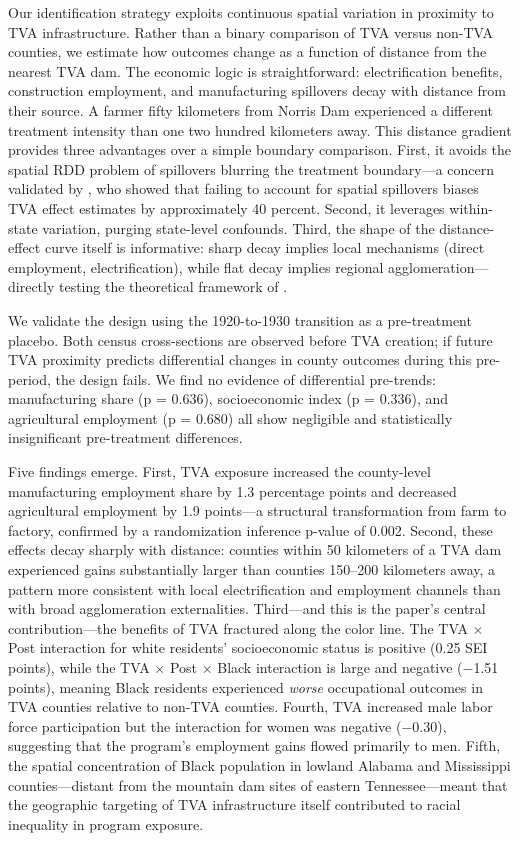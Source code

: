 \documentclass[12pt]{article}
\begin{document}
Our identification strategy exploits continuous spatial variation in proximity to TVA infrastructure. Rather than a binary comparison of TVA versus non-TVA counties, we estimate how outcomes change as a function of distance from the nearest TVA dam. The economic logic is straightforward: electrification benefits, construction employment, and manufacturing spillovers decay with distance from their source. A farmer fifty kilometers from Norris Dam experienced a different treatment intensity than one two hundred kilometers away. This distance gradient provides three advantages over a simple boundary comparison. First, it avoids the spatial RDD problem of spillovers blurring the treatment boundary---a concern validated by \citet{butts2024}, who showed that failing to account for spatial spillovers biases TVA effect estimates by approximately 40 percent. Second, it leverages within-state variation, purging state-level confounds. Third, the shape of the distance-effect curve itself is informative: sharp decay implies local mechanisms (direct employment, electrification), while flat decay implies regional agglomeration---directly testing the theoretical framework of \citet{kline2014}.

We validate the design using the 1920-to-1930 transition as a pre-treatment placebo. Both census cross-sections are observed before TVA creation; if future TVA proximity predicts differential changes in county outcomes during this pre-period, the design fails. We find no evidence of differential pre-trends: manufacturing share (p = 0.636), socioeconomic index (p = 0.336), and agricultural employment (p = 0.680) all show negligible and statistically insignificant pre-treatment differences.

Five findings emerge. First, TVA exposure increased the county-level manufacturing employment share by 1.3 percentage points and decreased agricultural employment by 1.9 points---a structural transformation from farm to factory, confirmed by a randomization inference p-value of 0.002. Second, these effects decay sharply with distance: counties within 50 kilometers of a TVA dam experienced gains substantially larger than counties 150--200 kilometers away, a pattern more consistent with local electrification and employment channels than with broad agglomeration externalities. Third---and this is the paper's central contribution---the benefits of TVA fractured along the color line. The TVA $\times$ Post interaction for white residents' socioeconomic status is positive (0.25 SEI points), while the TVA $\times$ Post $\times$ Black interaction is large and negative ($-$1.51 points), meaning Black residents experienced \emph{worse} occupational outcomes in TVA counties relative to non-TVA counties. Fourth, TVA increased male labor force participation but the interaction for women was negative ($-$0.30), suggesting that the program's employment gains flowed primarily to men. Fifth, the spatial concentration of Black population in lowland Alabama and Mississippi counties---distant from the mountain dam sites of eastern Tennessee---meant that the geographic targeting of TVA infrastructure itself contributed to racial inequality in program exposure.
\end{document}
